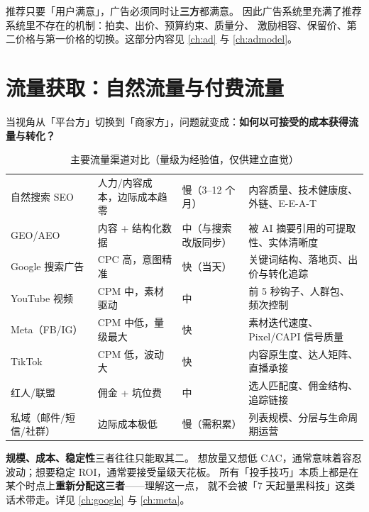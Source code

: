 \begin{keypoint}[广告与推荐的最大区别]
推荐只要「用户满意」，广告必须同时让\textbf{三方}都满意。
因此广告系统里充满了推荐系统里不存在的机制：拍卖、出价、预算约束、质量分、
激励相容、保留价、第二价格与第一价格的切换。这部分内容见 \cref{ch:ad} 与 \cref{ch:admodel}。
\end{keypoint}

\section{流量获取：自然流量与付费流量}

当视角从「平台方」切换到「商家方」，问题就变成：\textbf{如何以可接受的成本获得流量与转化？}

\begin{table}[htbp]
\centering
\caption{主要流量渠道对比（量级为经验值，仅供建立直觉）}
\label{tab:channels}
\small
\begin{tabularx}{\textwidth}{L{2.3cm} L{1.9cm} L{1.9cm} Y}
\toprule
{} &  &  &  \\
\midrule
自然搜索 SEO & 人力/内容成本，边际成本趋零 & 慢（3--12 个月） & 内容质量、技术健康度、外链、E-E-A-T \\
\addlinespace
GEO/AEO & 内容 + 结构化数据 & 中（与搜索改版同步） & 被 AI 摘要引用的可提取性、实体清晰度 \\
\addlinespace
Google 搜索广告 & CPC 高，意图精准 & 快（当天） & 关键词结构、落地页、出价与转化追踪 \\
\addlinespace
YouTube 视频 & CPM 中，素材驱动 & 中 & 前 5 秒钩子、人群包、频次控制 \\
\addlinespace
Meta（FB/IG） & CPM 中低，量级最大 & 快 & 素材迭代速度、Pixel/CAPI 信号质量 \\
\addlinespace
TikTok & CPM 低，波动大 & 快 & 内容原生度、达人矩阵、直播承接 \\
\addlinespace
红人/联盟 & 佣金 + 坑位费 & 中 & 选人匹配度、佣金结构、追踪链接 \\
\addlinespace
私域（邮件/短信/社群） & 边际成本极低 & 慢（需积累） & 列表规模、分层与生命周期运营 \\
\bottomrule
\end{tabularx}
\end{table}

\begin{insight}
\textbf{规模、成本、稳定性}三者往往只能取其二。
想放量又想低 CAC，通常意味着容忍波动；想要稳定 ROI，通常要接受量级天花板。
所有「投手技巧」本质上都是在某个时点上\textbf{重新分配这三者}——理解这一点，
就不会被「7 天起量黑科技」这类话术带走。详见 \cref{ch:google} 与 \cref{ch:meta}。
\end{insight}

